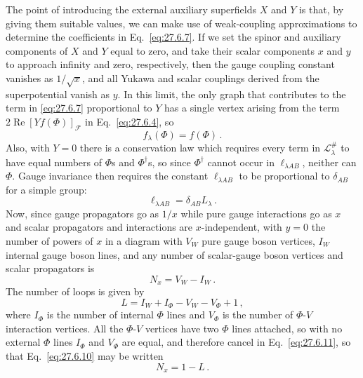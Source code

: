 The point of introducing the external auxiliary superfields \(X\) and \(Y\)
is that, by giving them suitable values, we can make use of weak-coupling
approximations to determine the coefficients in Eq.~\eqref{eq:27.6.7}. If we
set the spinor and auxiliary components of \(X\) and \(Y\) equal to zero,
and take their scalar components \(x\) and \(y\) to approach infinity and
zero, respectively, then the gauge coupling constant vanishes as
\(1/\sqrt{x}\), and all Yukawa and scalar couplings derived from the
superpotential vanish as \(y\). In this limit, the only graph that contributes
to the term in \eqref{eq:27.6.7} proportional to \(Y\) has a single vertex
arising from the term \(2\operatorname{Re}[Yf(\Phi)]_{\mathcal{F}}\) in
Eq.~\eqref{eq:27.6.4}, so
\begin{equation}
  f_\lambda(\Phi)=f(\Phi)\,.
  \tag{27.6.8}\label{eq:27.6.8}
\end{equation}
Also, with \(Y=0\) there is a conservation law which requires every term in
\(\mathcal{L}^{\#}_\lambda\) to have equal numbers of \(\Phi\)s and
\(\Phi^\dagger\)s, so since \(\Phi^\dagger\) cannot occur in
\(\ell_{\lambda AB}\), neither can \(\Phi\). Gauge invariance then requires
the constant \(\ell_{\lambda AB}\) to be proportional to \(\delta_{AB}\)
for a simple group:
\begin{equation}
  \ell_{\lambda AB}=\delta_{AB}L_\lambda\,.
  \tag{27.6.9}\label{eq:27.6.9}
\end{equation}
Now, since gauge propagators go as \(1/x\) while pure gauge interactions go
as \(x\) and scalar propagators and interactions are \(x\)-independent, with
\(y=0\) the number of powers of \(x\) in a diagram with \(V_W\) pure gauge
boson vertices, \(I_W\) internal gauge boson lines, and any number of
scalar-gauge boson vertices and scalar propagators is
\begin{equation}
  N_x=V_W-I_W\,.
  \tag{27.6.10}\label{eq:27.6.10}
\end{equation}
The number of loops is given by
\begin{equation}
  L=I_W+I_\Phi-V_W-V_\Phi+1\,,
  \tag{27.6.11}\label{eq:27.6.11}
\end{equation}
where \(I_\Phi\) is the number of internal \(\Phi\) lines and \(V_\Phi\) is
the number of \(\Phi\)-\(V\) interaction vertices. All the \(\Phi\)-\(V\)
vertices have two \(\Phi\) lines attached, so with no external \(\Phi\)
lines \(I_\Phi\) and \(V_\Phi\) are equal, and therefore cancel in
Eq.~\eqref{eq:27.6.11}, so that Eq.~\eqref{eq:27.6.10} may be written
\begin{equation}
  N_x=1-L\,.
  \tag{27.6.12}\label{eq:27.6.12}
\end{equation}
